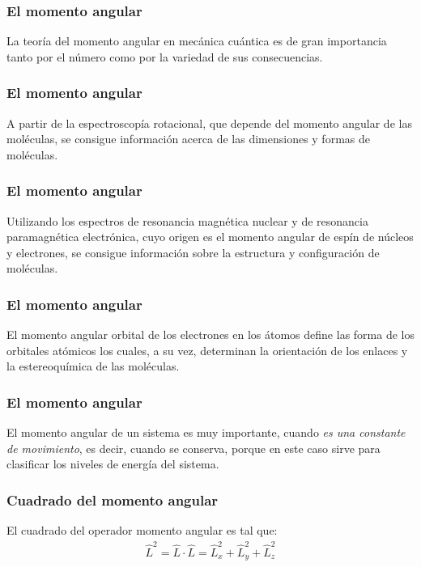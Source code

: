 \documentclass[12pt]{beamer}
\begin{document}
\begin{frame}
\frametitle{El momento angular}
La teoría del momento angular en mecánica cuántica es de gran importancia tanto por el número como por la variedad de sus consecuencias.
\end{frame}
\begin{frame}
\frametitle{El momento angular}
A partir de la espectroscopía rotacional, que depende del momento angular de las moléculas, se consigue información acerca de las dimensiones y formas de moléculas.
\end{frame}
\begin{frame}
\frametitle{El momento angular}
Utilizando los espectros de resonancia magnética nuclear y de resonancia paramagnética electrónica, \pause cuyo origen es el momento angular de espín de núcleos y electrones, \pause se consigue información sobre la estructura y configuración de moléculas.
\end{frame}
\begin{frame}
\frametitle{El momento angular}
El momento angular orbital de los electrones en los átomos define las forma de los orbitales atómicos los cuales, a su vez, determinan la orientación de los enlaces y la estereoquímica de las moléculas.
\end{frame}
\begin{frame}
\frametitle{El momento angular}
El momento angular de un sistema es muy importante, cuando \emph{es una constante de movimiento}, es decir, cuando se conserva, porque en este caso sirve para clasificar los niveles de energía del sistema.
\end{frame}
\begin{frame}
\frametitle{Cuadrado del momento angular}
El cuadrado del operador momento angular es tal que:
\pause
\begin{align}
\hat{L}^{2} = \hat{L} \cdot \hat{L} = \hat{L}_{x}^{2} + \hat{L}_{y}^{2} + \hat{L}_{z}^{2}
\label{eq:ecuacion_01_03b}
\end{align}
\end{frame}
\end{document}

